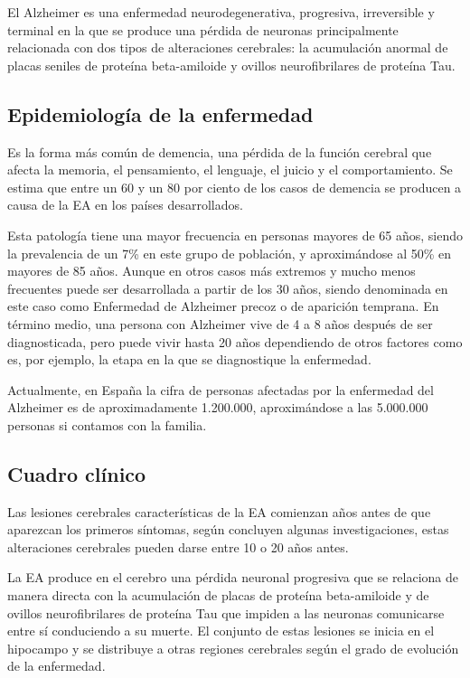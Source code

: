 
El Alzheimer es una enfermedad neurodegenerativa, progresiva, irreversible y terminal en la que se produce una pérdida
de neuronas principalmente relacionada con dos tipos de alteraciones cerebrales: la acumulación anormal de placas
seniles de proteína beta-amiloide y ovillos neurofibrilares de proteína Tau.

\subsection{Epidemiología de la enfermedad}\label{subsec:epidemiologia}
Es la forma más común de demencia, una pérdida de la función cerebral que afecta la memoria, el pensamiento, el
lenguaje, el juicio y el comportamiento.
Se estima que entre un 60 y un 80 por ciento de los casos de demencia se producen a causa de la EA en los países
desarrollados.

Esta patología tiene una mayor frecuencia en personas mayores de 65 años, siendo la prevalencia de un 7\% en este grupo
de población, y aproximándose al 50\% en mayores de 85 años.
Aunque en otros casos más extremos y mucho menos frecuentes puede ser desarrollada a partir de los 30 años, siendo
denominada en este caso como Enfermedad de Alzheimer precoz o de aparición temprana.
En término medio, una persona con Alzheimer vive de 4 a 8 años después de ser diagnosticada, pero puede vivir hasta 20
años dependiendo de otros factores como es, por ejemplo, la etapa en la que se diagnostique la enfermedad.

Actualmente, en España la cifra de personas afectadas por la enfermedad del Alzheimer es de aproximadamente 1.200.000,
aproximándose a las 5.000.000 personas si contamos con la familia.

\subsection{Cuadro clínico}\label{subsec:cuadro-clinico}
Las lesiones cerebrales características de la EA comienzan años antes de que aparezcan los primeros síntomas, según
concluyen algunas investigaciones, estas alteraciones cerebrales pueden darse entre 10 o 20 años antes.

La EA produce en el cerebro una pérdida neuronal progresiva que se relaciona de manera directa con la acumulación de
placas de proteína beta-amiloide y de ovillos neurofibrilares de proteína Tau que impiden a las neuronas comunicarse
entre sí conduciendo a su muerte.
El conjunto de estas lesiones se inicia en el hipocampo y se distribuye a otras regiones cerebrales según el grado de
evolución de la enfermedad.

